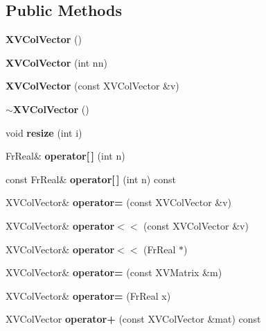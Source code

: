 \subsection*{Public Methods}
\begin{CompactItemize}
\item 
{\bf XVCol\-Vector} ()
\item 
{\bf XVCol\-Vector} (int nn)
\item 
{\bf XVCol\-Vector} (const XVCol\-Vector \&v)
\item 
{\bf $\sim$XVCol\-Vector} ()
\item 
void {\bf resize} (int i)
\item 
Fr\-Real\& {\bf operator\mbox{[}$\,$\mbox{]}} (int n)
\item 
const Fr\-Real\& {\bf operator\mbox{[}$\,$\mbox{]}} (int n) const
\item 
\label{XVColVector_a7}
\hypertarget{class_XVColVector_a7}{
XVCol\-Vector\& {\bf operator=} (const XVCol\-Vector \&v)}

\item 
\label{XVColVector_a8}
\hypertarget{class_XVColVector_a8}{
XVCol\-Vector\& {\bf operator$<$$<$} (const XVCol\-Vector \&v)}

\item 
\label{XVColVector_a9}
\hypertarget{class_XVColVector_a9}{
XVCol\-Vector\& {\bf operator$<$$<$} (Fr\-Real $\ast$)}

\item 
\label{XVColVector_a10}
\hypertarget{class_XVColVector_a10}{
XVCol\-Vector\& {\bf operator=} (const XVMatrix \&m)}

\item 
\label{XVColVector_a11}
\hypertarget{class_XVColVector_a11}{
XVCol\-Vector\& {\bf operator=} (Fr\-Real x)}

\item 
\label{XVColVector_a12}
\hypertarget{class_XVColVector_a12}{
XVCol\-Vector {\bf operator+} (const XVCol\-Vector \&mat) const}


\end{CompactItemize}
